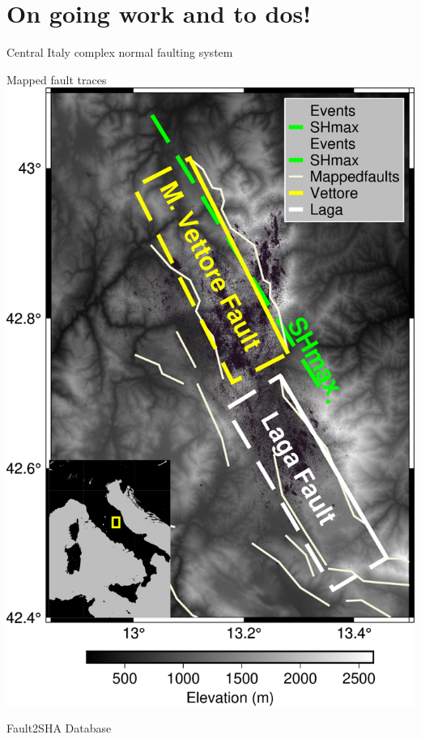 \documentclass{beamer}
\begin{document}
\section{On going work and to dos!}


\begin{frame}
  {Central Italy complex normal faulting system}

  \begin{minipage}{0.4\linewidth}
  \begin{center}
   \vskip 0.2cm Mapped fault traces \\
   \vskip 0.3cm
   \includegraphics[width=1\linewidth]{images/map_italy.png}
  \end{center}
  \vskip -0.2cm \tiny Fault2SHA Database \citep{Walker_2021_FAULT2SHA}
 \end{minipage} \

\end{frame}
\end{document}
